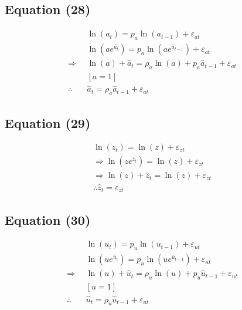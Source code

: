 \documentclass[11pt,preprint, authoryear]{elsarticle}
\numberwithin{equation}{section}
\numberwithin{figure}{section}
\numberwithin{table}{section}
\begin{document}
\hypertarget{equation-28}{%
\subsection{Equation (28)}\label{equation-28}}

\[\begin{aligned}
& \ln \left(a_{t}\right)=p_{a} \ln \left(a_{t-1}\right)+\varepsilon_{a t} \\
& \ln \left(a e^{\hat{a}_{t}}\right)=p_{a} \ln \left(a e^{\hat{a}_{t-1}}\right)+\varepsilon_{a t} \\
\Rightarrow & \ln (a)+\hat{a}_{t}=\rho_{a} \ln (a)+p_{a} \hat{a}_{t-1}+\varepsilon_{a t} \\
&[a =1] \\
\therefore \quad & \hat{a}_{t} =\rho_{a} \hat{a}_{t-1}+\varepsilon_{a t}
\end{aligned}\]

\hypertarget{equation-29}{%
\subsection{Equation (29)}\label{equation-29}}

\[\begin{aligned}
\ln(z_t)=\ln(z) + \varepsilon_{z t}\\
\Rightarrow \ln\left(z e^{\hat{z}_t}\right) =\ln (z)+\varepsilon_{z t}\\
\Rightarrow  \ln (z)+\hat{z}_{t}=\ln (z)+\varepsilon_{z t}\\
\therefore \hat{z}_t = \varepsilon_{z t}
\end{aligned}\]

\hypertarget{equation-30}{%
\subsection{Equation (30)}\label{equation-30}}

\[\begin{aligned}
& \ln \left(u_{t}\right)=p_{u} \ln \left(u_{t-1}\right)+\varepsilon_{u t} \\
& \ln \left(u e^{\hat{u}_{t}}\right)=p_{u} \ln \left(u e^{\hat{u}_{t-1}}\right)+\varepsilon_{u t} \\
\Rightarrow & \ln (u)+\hat{u}_{t}=\rho_{u} \ln (u)+p_{u} \hat{u}_{t-1}+\varepsilon_{u t} \\
&[u =1] \\
\therefore \quad &\hat{u}_{t} =\rho_{u} \hat{u}_{t-1}+\varepsilon_{u t}
\end{aligned}\]
\end{document}
